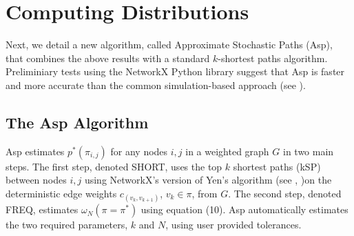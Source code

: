 \documentclass[twocolumn]{article}
\begin{document}
\section{Computing  Distributions}
Next, we detail a new algorithm, called Approximate Stochastic Paths (Asp), that combines the above results with a standard $k$-shortest paths algorithm. Preliminiary tests using the  NetworkX Python library suggest that Asp is faster and more accurate than the common simulation-based approach (see \cite{frank_1969}).


\subsection{The Asp Algorithm}
Asp estimates $p^{*}(\pi_{i,j})$ for any nodes $i,j$ in a weighted graph $G$ in two main steps. The first step, denoted SHORT, uses the top $k$ shortest paths (kSP) between nodes $i,j$ using NetworkX's version of Yen's algorithm (see \cite{netx}, \cite{Yen1971})on the deterministic edge weights $c_{(v_{k},v_{k+1})}$, $v_{k} \in \pi$, from $G$. The second step, denoted FREQ, estimates $\omega_{N}(\pi = \pi^{\ast})$ using equation (10). Asp automatically estimates the two required parameters, $k$ and $N$, using user provided tolerances.\\
\end{document}
